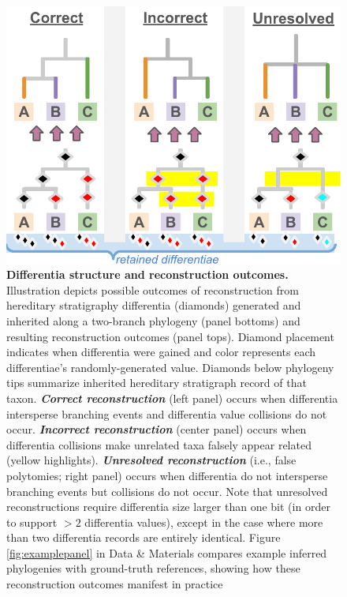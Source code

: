 \begin{figure}
  \centering
  \includegraphics[width=\linewidth]{img/hstrat-failure-modes}
  \caption{%
    \textbf{Differentia structure and reconstruction outcomes.}
    \footnotesize
    Illustration depicts possible outcomes of reconstruction from hereditary stratigraphy differentia (diamonds) generated and inherited along a two-branch phylogeny (panel bottoms) and resulting reconstruction outcomes (panel tops).
    Diamond placement indicates when differentia were gained and color represents each differentiae's randomly-generated value.
    Diamonds below phylogeny tips summarize inherited hereditary stratigraph record of that taxon.
    \textbf{\textit{Correct reconstruction}} (left panel) occurs when differentia intersperse branching events and differentia value collisions do not occur.
    \textbf{\textit{Incorrect reconstruction}} (center panel) occurs when differentia collisions make unrelated taxa falsely appear related (yellow highlights).
    \textbf{\textit{Unresolved reconstruction}} (i.e., false polytomies; right panel) occurs when differentia do not intersperse branching events but collisions do not occur.
    Note that unresolved reconstructions require differentia size larger than one bit (in order to support $>2$ differentia values), except in the case where more than two differentia records are entirely identical.
    Figure \ref{fig:examplepanel} in Data \& Materials compares example inferred phylogenies with ground-truth references, showing how these reconstruction outcomes manifest in practice \citep{moreno2024supplemental}
  }
  \label{fig:hstrat-failure-modes}
\end{figure}

